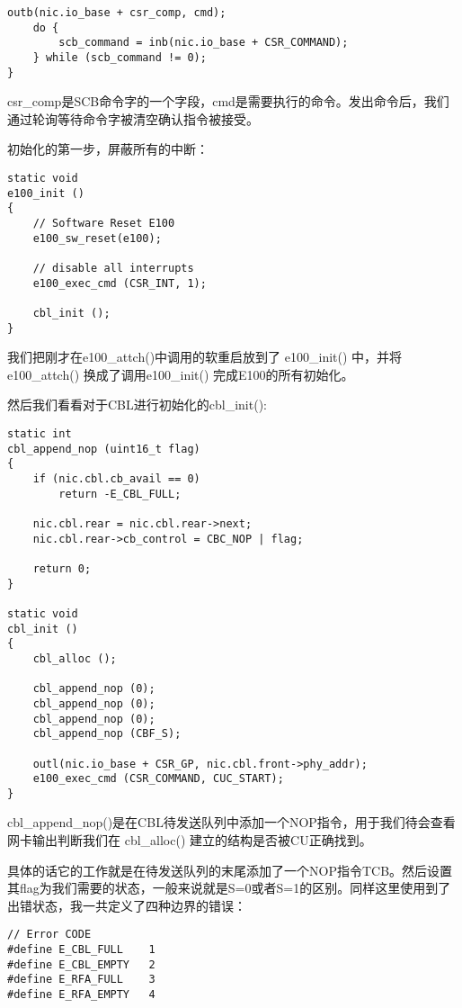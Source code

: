 \documentclass{article}
\newcommand{\funcname}[1]{{\ttfamily \small #1}}
\begin{document}
\begin{CJK*}{UTF8}{gkai}
\begin{lstlisting}[style=ccode, title={\scriptsize \ttfamily \bfseries kern/e100.c: e100\_exec\_cmd()}]
    outb(nic.io_base + csr_comp, cmd);
    do {
        scb_command = inb(nic.io_base + CSR_COMMAND);
    } while (scb_command != 0);
}
\end{lstlisting}

csr\_comp是SCB命令字的一个字段，cmd是需要执行的命令。发出命令后，我们通过轮询等待命令字被清空确认指令被接受。

初始化的第一步，屏蔽所有的中断：

\begin{lstlisting}[style=ccode, title={\scriptsize \ttfamily \bfseries kern/e100.c: e100\_init()}]
static void
e100_init ()
{
    // Software Reset E100
    e100_sw_reset(e100);

    // disable all interrupts
    e100_exec_cmd (CSR_INT, 1);

    cbl_init ();
}
\end{lstlisting}

我们把刚才在\funcname{e100\_attch()}中调用的软重启放到了 \funcname{e100\_init()} 中，并将 \funcname{e100\_attch()} 换成了调用\funcname{e100\_init()} 完成E100的所有初始化。

然后我们看看对于CBL进行初始化的\funcname{cbl\_init()}:

\begin{lstlisting}[style=ccode, title={\scriptsize \ttfamily \bfseries kern/e100.c: cbl\_init()}]
static int
cbl_append_nop (uint16_t flag)
{
    if (nic.cbl.cb_avail == 0)
        return -E_CBL_FULL;

    nic.cbl.rear = nic.cbl.rear->next;
    nic.cbl.rear->cb_control = CBC_NOP | flag;

    return 0;
}

static void
cbl_init () 
{
    cbl_alloc ();

    cbl_append_nop (0);
    cbl_append_nop (0);
    cbl_append_nop (0);
    cbl_append_nop (CBF_S);

    outl(nic.io_base + CSR_GP, nic.cbl.front->phy_addr);
    e100_exec_cmd (CSR_COMMAND, CUC_START); 
}
\end{lstlisting}

\funcname{cbl\_append\_nop()}是在CBL待发送队列中添加一个NOP指令，用于我们待会查看网卡输出判断我们在 \funcname{cbl\_alloc()} 建立的结构是否被CU正确找到。

具体的话它的工作就是在待发送队列的末尾添加了一个NOP指令TCB。然后设置其flag为我们需要的状态，一般来说就是S=0或者S=1的区别。同样这里使用到了出错状态，我一共定义了四种边界的错误：


\begin{lstlisting}[style=ccode, title={\scriptsize \ttfamily \bfseries kern/e100.h}]
// Error CODE
#define E_CBL_FULL    1
#define E_CBL_EMPTY   2
#define E_RFA_FULL    3
#define E_RFA_EMPTY   4
\end{lstlisting}



\end{CJK*}
\end{document}
